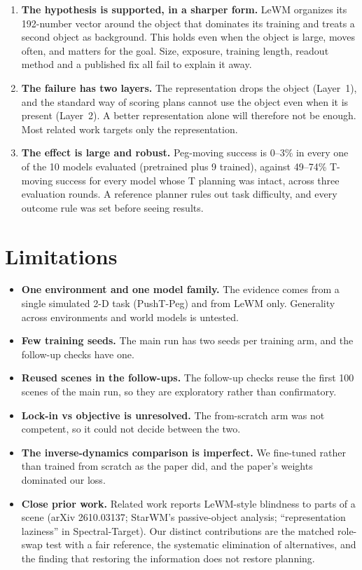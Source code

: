 \documentclass[11pt]{article}
\begin{document}
\begin{enumerate}
  \item \textbf{The hypothesis is supported, in a sharper form.} LeWM organizes its 192-number vector around the object that dominates its training and treats a second object as background. This holds even when the object is large, moves often, and matters for the goal. Size, exposure, training length, readout method and a published fix all fail to explain it away.
  \item \textbf{The failure has two layers.} The representation drops the object (Layer~1), and the standard way of scoring plans cannot use the object even when it is present (Layer~2). A better representation alone will therefore not be enough. Most related work targets only the representation.
  \item \textbf{The effect is large and robust.} Peg-moving success is 0--3\% in every one of the 10 models evaluated (pretrained plus 9 trained), against 49--74\% T-moving success for every model whose T planning was intact, across three evaluation rounds. A reference planner rules out task difficulty, and every outcome rule was set before seeing results.
\end{enumerate}

\section{Limitations}
\begin{itemize}
  \item \textbf{One environment and one model family.} The evidence comes from a single simulated 2-D task (PushT-Peg) and from LeWM only. Generality across environments and world models is untested.
  \item \textbf{Few training seeds.} The main run has two seeds per training arm, and the follow-up checks have one.
  \item \textbf{Reused scenes in the follow-ups.} The follow-up checks reuse the first 100 scenes of the main run, so they are exploratory rather than confirmatory.
  \item \textbf{Lock-in vs objective is unresolved.} The from-scratch arm was not competent, so it could not decide between the two.
  \item \textbf{The inverse-dynamics comparison is imperfect.} We fine-tuned rather than trained from scratch as the paper did, and the paper's weights dominated our loss.
  \item \textbf{Close prior work.} Related work reports LeWM-style blindness to parts of a scene (arXiv 2610.03137; StarWM's passive-object analysis; ``representation laziness'' in Spectral-Target). Our distinct contributions are the matched role-swap test with a fair reference, the systematic elimination of alternatives, and the finding that restoring the information does not restore planning.
\end{itemize}
\end{document}
